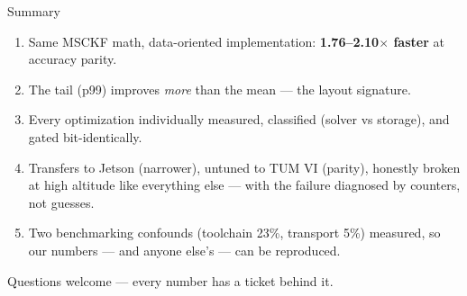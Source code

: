 \documentclass[aspectratio=169,11pt]{beamer}
\begin{document}
\begin{frame}{Summary}
  \begin{enumerate}
    \item Same MSCKF math, data-oriented implementation:
          \textbf{1.76--2.10$\times$ faster} at accuracy parity.
    \item The tail (p99) improves \emph{more} than the mean --- the layout
          signature.
    \item Every optimization individually measured, classified
          (solver vs storage), and gated bit-identically.
    \item Transfers to Jetson (narrower), untuned to TUM VI (parity),
          honestly broken at high altitude like everything else --- with
          the failure diagnosed by counters, not guesses.
    \item Two benchmarking confounds (toolchain 23\%, transport 5\%)
          measured, so our numbers --- and anyone else's --- can be
          reproduced.
  \end{enumerate}
  \vfill
  \centering\small Questions welcome --- every number has a ticket behind it.
\end{frame}
\end{document}
